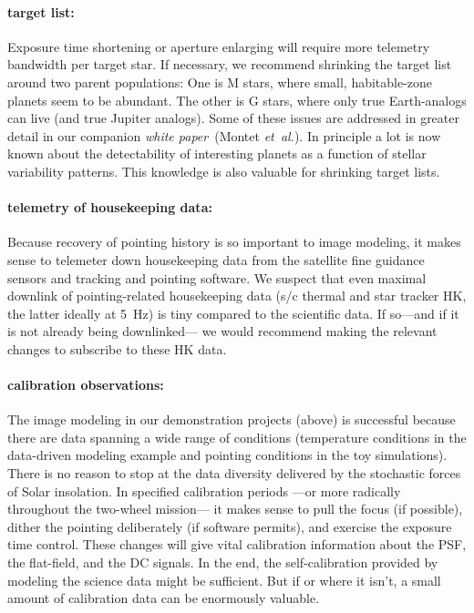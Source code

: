 \documentclass[letterpaper,12pt,whitepaper]{haastex}
\newcommand{\documentname}{\textsl{white paper}}
\newcommand{\foreign}[1]{\textit{#1}}
\newcommand{\etal}{\foreign{et~al.}}
\newcounter{address}
\begin{document}
\paragraph{target list:}
Exposure time shortening or aperture enlarging will require more telemetry bandwidth per target star.
If necessary, we recommend shrinking the target list around two parent populations:
One is M stars, where small, habitable-zone planets seem to be abundant.
The other is G stars, where only true Earth-analogs can live (and true Jupiter analogs).
Some of these issues are addressed in greater detail in our companion \documentname\ (Montet \etal).
In principle a lot is now known about the detectability of interesting planets
  as a function of stellar variability patterns.
This knowledge is also valuable for shrinking target lists.

\paragraph{telemetry of housekeeping data:}
Because recovery of pointing history is so important to image modeling,
  it makes sense to telemeter down housekeeping data from the
  satellite fine guidance sensors and tracking and pointing software.
We suspect that even maximal downlink of pointing-related housekeeping data
  (s/c thermal and star tracker HK, the latter ideally at 5~Hz)
  is tiny compared to the scientific data.
If so---and if it is not already being downlinked---%
  we would recommend making the relevant changes to subscribe to these HK data.

\paragraph{calibration observations:}
The image modeling in our demonstration projects (above) is successful
  because there are data spanning a wide range of conditions
  (temperature conditions in the data-driven modeling example
   and pointing conditions in the toy simulations).
There is no reason to stop at the data diversity delivered by the
  stochastic forces of Solar insolation.
In specified calibration periods%
  ---or more radically throughout the two-wheel mission---%
  it makes sense to pull the focus (if possible),
  dither the pointing deliberately (if software permits),
  and exercise the exposure time control.
These changes will give vital calibration information about
  the PSF, the flat-field, and the DC signals.
In the end, the self-calibration provided by modeling the science
  data might be sufficient.
But if or where it isn't, a small amount of calibration data can be enormously valuable.
\end{document}
